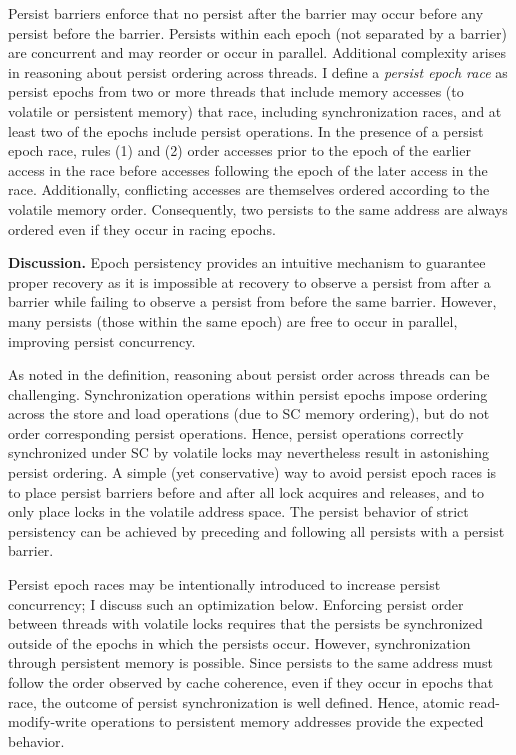 Persist barriers enforce that no persist after the barrier may occur before any persist before the barrier.
Persists within each epoch (not separated by a barrier) are concurrent and may reorder or occur in parallel.
Additional complexity arises in reasoning about persist ordering across threads. 
I define a \emph{persist epoch race} as persist epochs from two or more threads that include memory accesses (to volatile or persistent memory) that race, including synchronization races, and at least two of the epochs include persist operations. 
In the presence of a persist epoch race, rules (1) and (2) order accesses prior to the epoch of the earlier access in the race before accesses following the epoch of the later access in the race.
Additionally, conflicting accesses are themselves ordered according to the volatile memory order.
Consequently, two persists to the same address are always ordered even if they occur in racing epochs.

\textbf{Discussion.}
Epoch persistency provides an intuitive mechanism to guarantee proper recovery as it is impossible at recovery to observe a persist from after a barrier while failing to observe a persist from before the same barrier.
However, many persists (those within the same epoch) are free to occur in parallel, improving persist concurrency.

As noted in the definition, reasoning about persist order across threads can be challenging.
Synchronization operations within persist epochs impose ordering across the store and load operations (due to SC memory ordering), but do not order corresponding persist operations.
Hence, persist operations correctly synchronized under SC by volatile locks may nevertheless result in astonishing persist ordering.
A simple (yet conservative) way to avoid persist epoch races is to place persist barriers before and after all lock acquires and releases, and to only place locks in the volatile address space.
The persist behavior of strict persistency can be achieved by preceding and following all persists with a persist barrier.

Persist epoch races may be intentionally introduced to increase persist concurrency; I discuss such an optimization below.
Enforcing persist order between threads with volatile locks requires that the persists be synchronized outside of the epochs in which the persists occur.
However, synchronization through persistent memory is possible.
Since persists to the same address must follow the order observed by cache coherence, even if they occur in epochs that race, the outcome of persist synchronization is well defined.
Hence, atomic read-modify-write operations to persistent memory addresses provide the expected behavior.

